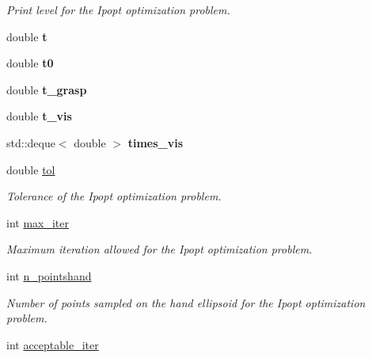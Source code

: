 \begin{DoxyCompactItemize}
\begin{DoxyCompactList}\small\item\em Print level for the Ipopt optimization problem. \end{DoxyCompactList}\item 
double {\bfseries t}\label{classGraspingModule_a4f36c3ca4e343f62ec908768af45a3da}

\item 
double {\bfseries t0}\label{classGraspingModule_a70a4e9c60616c7e7c63b11594e73a6ac}

\item 
double {\bfseries t\+\_\+grasp}\label{classGraspingModule_aaf674331d6bbf84ea008566948c6dee2}

\item 
double {\bfseries t\+\_\+vis}\label{classGraspingModule_ae0cddf0f4c4e7d00197a1c45ff98f0e5}

\item 
std\+::deque$<$ double $>$ {\bfseries times\+\_\+vis}\label{classGraspingModule_a9a0dedfb6b400af32cd04a9eafd43dba}

\item 
double \hyperlink{classGraspingModule_a521b7c66535fb4dac516a9ff58241f05}{tol}\label{classGraspingModule_a521b7c66535fb4dac516a9ff58241f05}

\begin{DoxyCompactList}\small\item\em Tolerance of the Ipopt optimization problem. \end{DoxyCompactList}\item 
int \hyperlink{classGraspingModule_a3f17b0601f067499b5f574fb8c6f937e}{max\+\_\+iter}\label{classGraspingModule_a3f17b0601f067499b5f574fb8c6f937e}

\begin{DoxyCompactList}\small\item\em Maximum iteration allowed for the Ipopt optimization problem. \end{DoxyCompactList}\item 
int \hyperlink{classGraspingModule_aa4dff98eeb8125bc88613b15159cd26c}{n\+\_\+pointshand}\label{classGraspingModule_aa4dff98eeb8125bc88613b15159cd26c}

\begin{DoxyCompactList}\small\item\em Number of points sampled on the hand ellipsoid for the Ipopt optimization problem. \end{DoxyCompactList}\item 
int \hyperlink{classGraspingModule_ab3821aa16b5021be595ac8b7db4d6cfb}{acceptable\+\_\+iter}\label{classGraspingModule_ab3821aa16b5021be595ac8b7db4d6cfb}


\end{DoxyCompactItemize}
